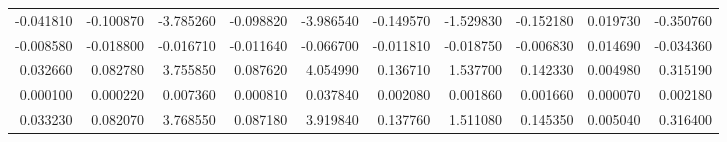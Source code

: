 \begin{longtable}{rrrrrrrrrr}
   -0.041810 &    -0.100870 &    -3.785260 &    -0.098820 &    -3.986540 &    -0.149570 &    -1.529830 &    -0.152180 &     0.019730 &    -0.350760 \\
   -0.008580 &    -0.018800 &    -0.016710 &    -0.011640 &    -0.066700 &    -0.011810 &    -0.018750 &    -0.006830 &     0.014690 &    -0.034360 \\
    0.032660 &     0.082780 &     3.755850 &     0.087620 &     4.054990 &     0.136710 &     1.537700 &     0.142330 &     0.004980 &     0.315190 \\
    0.000100 &     0.000220 &     0.007360 &     0.000810 &     0.037840 &     0.002080 &     0.001860 &     0.001660 &     0.000070 &     0.002180 \\
    0.033230 &     0.082070 &     3.768550 &     0.087180 &     3.919840 &     0.137760 &     1.511080 &     0.145350 &     0.005040 &     0.316400 \\
\end{longtable}
